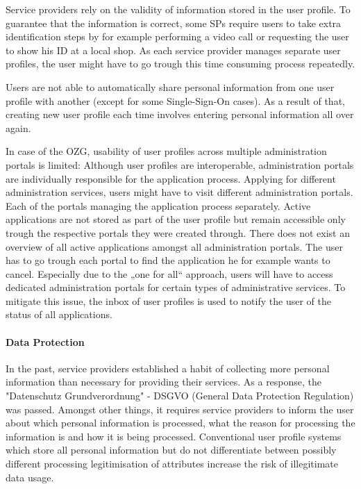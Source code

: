 Service providers rely on the validity of information stored in the user profile. To guarantee that the information is correct, some SPs require users to take extra identification steps by for example performing a video call or requesting the user to show his ID at a local shop. As each service provider manages separate user profiles, the user might have to go trough this time consuming process repeatedly.

Users are not able to automatically share personal information from one user profile with another (except for some Single-Sign-On cases). As a result of that, creating new user profile each time involves entering personal information all over again. 


In case of the OZG, usability of user profiles across multiple administration portals is limited: Although user profiles are interoperable, administration portals are individually responsible for the application process. Applying for different administration services, users might have to visit different administration portals. Each of the portals managing the application process separately. Active applications are not stored as part of the user profile but remain accessible only trough the respective portals they were created through. There does not exist an overview of all active applications amongst all administration portals. The user has to go trough each portal to find the application he for example wants to cancel. Especially due to the „one for all“ approach, users will have to access dedicated administration portals for certain types of administrative services. To mitigate this issue, the inbox of user profiles is used to notify the user of the status of all applications.

\paragraph{Data Protection}
In the past, service providers established a habit of collecting more personal information than necessary for providing their services. As a response, the "Datenschutz Grundverordnung" - DSGVO (General Data Protection Regulation) was passed. Amongst other things, it requires service providers to inform the user about which personal information is processed, what the reason for processing the information is and how it is being processed. Conventional user profile systems which store all personal information but do not differentiate between possibly different processing legitimisation of attributes increase the risk of illegitimate data usage.


